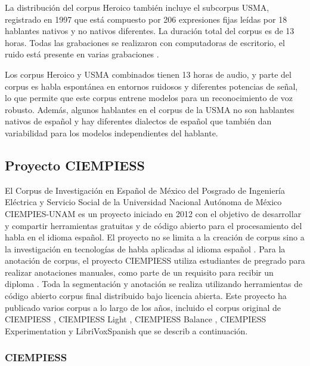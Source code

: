 La distribución del corpus Heroico también incluye el subcorpus USMA, registrado en 1997 que está compuesto por 206 expresiones fijas leídas por 18 hablantes nativos y no nativos diferentes. La duración total del corpus es de 13 horas. Todas las grabaciones se realizaron con computadoras de escritorio, el ruido está presente en varias grabaciones \cite{heroico}.

Los corpus Heroico y USMA combinados tienen 13 horas de audio, y parte del corpus es habla espontánea en entornos ruidosos y diferentes potencias de señal, lo que permite que este corpus entrene modelos para un reconocimiento de voz robusto. Además, algunos hablantes en el corpus de la USMA no son hablantes nativos de español y hay diferentes dialectos de español que también dan variabilidad para los modelos independientes del hablante.

\subsection{Proyecto CIEMPIESS}

El Corpus de Investigación en Español de México del Posgrado de Ingeniería Eléctrica y Servicio Social de la Universidad Nacional Autónoma de México CIEMPIES-UNAM es un proyecto iniciado en 2012 con el objetivo de desarrollar y compartir herramientas gratuitas y de código abierto para el procesamiento del habla en el idioma español. El proyecto no se limita a la creación de corpus sino a la investigación en tecnologías de habla aplicadas al idioma español \cite{CIEMPIESS-Webpage}. Para la anotación de corpus, el proyecto CIEMPIESS utiliza estudiantes de pregrado para realizar anotaciones manuales, como parte de un requisito para recibir un diploma . Toda la segmentación y anotación se realiza utilizando herramientas de código abierto corpus final  distribuido bajo licencia abierta. Este proyecto ha publicado varios corpus a lo largo de los años, incluido el corpus original de CIEMPIESS \cite {CIEMPIESS}, CIEMPIESS Light \cite {CIEMPIESS-LIGHT}, CIEMPIESS Balance \cite {CIEMPIESS-BALANCE}, CIEMPIESS Experimentation \cite {CIEMPIESS-Experimentation} y LibriVoxSpanish \cite {LibriVox-Spanish} que se describ a continuación.

\subsubsection{CIEMPIESS}

